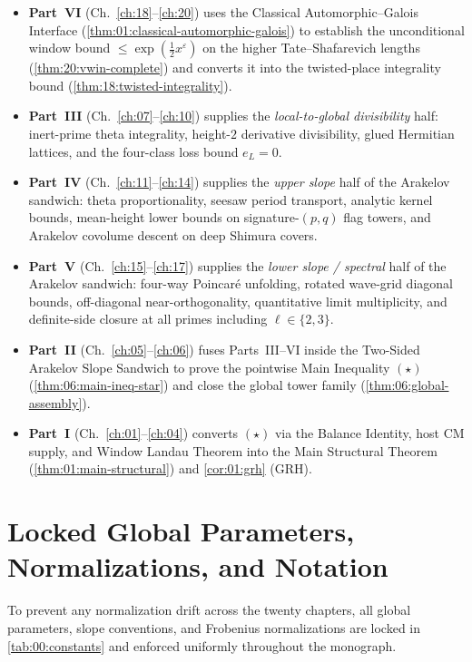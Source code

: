 \begin{itemize}
\item \textbf{Part~VI} (Ch.~\ref{ch:18}--\ref{ch:20}) uses the Classical Automorphic--Galois Interface (\cref{thm:01:classical-automorphic-galois}) to establish the unconditional window bound $\le \exp(\frac{1}{2}x^\varepsilon)$ on the higher Tate--Shafarevich lengths (\cref{thm:20:vwin-complete}) and converts it into the twisted-place integrality bound (\cref{thm:18:twisted-integrality}).
\item \textbf{Part~III} (Ch.~\ref{ch:07}--\ref{ch:10}) supplies the \emph{local-to-global divisibility} half: inert-prime theta integrality, height-$2$ derivative divisibility, glued Hermitian lattices, and the four-class loss bound $e_L = 0$.
\item \textbf{Part~IV} (Ch.~\ref{ch:11}--\ref{ch:14}) supplies the \emph{upper slope} half of the Arakelov sandwich: theta proportionality, seesaw period transport, analytic kernel bounds, mean-height lower bounds on signature-$(p,q)$ flag towers, and Arakelov covolume descent on deep Shimura covers.
\item \textbf{Part~V} (Ch.~\ref{ch:15}--\ref{ch:17}) supplies the \emph{lower slope / spectral} half of the Arakelov sandwich: four-way Poincar\'e unfolding, rotated wave-grid diagonal bounds, off-diagonal near-orthogonality, quantitative limit multiplicity, and definite-side closure at all primes including $\ell \in \{2,3\}$.
\item \textbf{Part~II} (Ch.~\ref{ch:05}--\ref{ch:06}) fuses Parts~III--VI inside the Two-Sided Arakelov Slope Sandwich to prove the pointwise Main Inequality $(\star)$ (\cref{thm:06:main-ineq-star}) and close the global tower family (\cref{thm:06:global-assembly}).
\item \textbf{Part~I} (Ch.~\ref{ch:01}--\ref{ch:04}) converts $(\star)$ via the Balance Identity, host CM supply, and Window Landau Theorem into the Main Structural Theorem (\cref{thm:01:main-structural}) and \cref{cor:01:grh} (GRH).
\end{itemize}

\section{Locked Global Parameters, Normalizations, and Notation}
\label{sec:00:notation}

To prevent any normalization drift across the twenty chapters, all global parameters, slope conventions, and Frobenius normalizations are locked in \cref{tab:00:constants} and enforced uniformly throughout the monograph.

